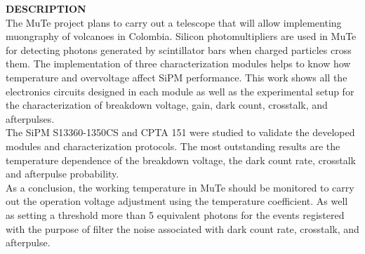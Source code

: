    
\noindent \textbf{DESCRIPTION}\\
The MuTe project plans to carry out a telescope that will allow implementing muongraphy of volcanoes in Colombia. Silicon photomultipliers are used in MuTe for detecting photons generated by scintillator bars when charged particles cross them. The implementation of three characterization modules helps to know how temperature and overvoltage affect SiPM performance. This work shows all the electronics circuits designed in each module as well as the experimental setup for the characterization of breakdown voltage, gain, dark count, crosstalk, and afterpulses.\\
The SiPM S13360-1350CS and CPTA 151 were studied to validate the developed modules and characterization protocols. The most outstanding results are the temperature dependence of the breakdown voltage, the dark count rate, crosstalk and afterpulse probability.\\
As a conclusion, the working temperature in MuTe should be monitored to carry out the operation voltage adjustment using the temperature coefficient. As well as setting a threshold more than 5 equivalent photons for the events registered with the purpose of filter the noise associated with dark count rate, crosstalk, and afterpulse.
			
